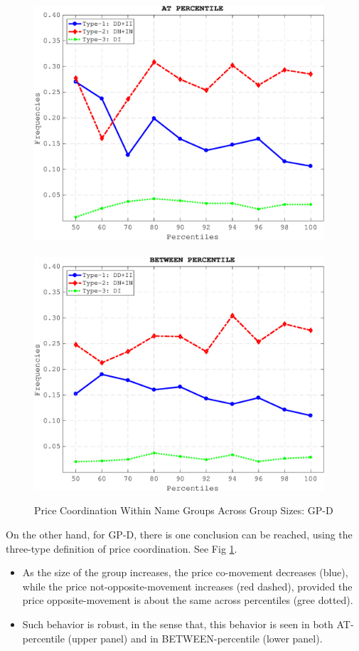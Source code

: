\begin{figure}[H]
	\includegraphics[width=4.25in]{pricecoordination_figure1}\\\medspace\\
	\includegraphics[width=4.25in]{pricecoordination_figure2}\\
	\caption{Price Coordination Within Name Groups Across Group Sizes: GP-D}
	\label{fig1}
\end{figure}

On the other hand, for GP-D, there is one conclusion can be reached, using the three-type definition of price coordination. See Fig \ref{fig1}.
\begin{itemize}
	\item As the size of the group increases, the price co-movement decreases (blue), while the price not-opposite-movement increases (red dashed), provided the price opposite-movement is about the same across percentiles (gree dotted).
	\item Such behavior is robust, in the sense that, this behavior is seen in both AT-percentile (upper panel) and in BETWEEN-percentile (lower panel).
\end{itemize}

